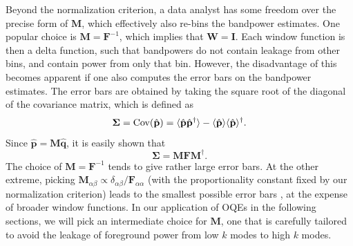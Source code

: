 \documentclass[twocolumn,numberedappendix]{emulateapj} \shorttitle{PSA64}
\newcommand{\phat}{\hat{\mathbf{p}}}
\newcommand{\qhat}{\hat{\mathbf{q}}}
\begin{document}
%
Beyond the normalization criterion, a data analyst has some freedom over the
precise form of $\mathbf{M}$, which effectively also re-bins the bandpower estimates. One 
popular choice is $\mathbf{M} = \mathbf{F}^{-1}$, which implies that $\mathbf{W} = \mathbf{I}$. Each
window function is then a delta function, such that bandpowers do not
contain leakage from other bins, and contain power from only that bin. However, the disadvantage
of this becomes apparent if one also computes the error bars on the bandpower estimates.
The error bars are obtained by taking the square root of the diagonal of the covariance matrix, which is defined as
\begin{equation}\label{eqn:err_cov}
    \boldsymbol \Sigma = \text{Cov}(\hat{\mathbf{p}}) = \expval{\hat{\mathbf{p}}\hat{\mathbf{p}}^{\dagger}} -
             \expval{\hat{\mathbf{p}}}\expval{\hat{\mathbf{p}}}^{\dagger}.
\end{equation}
Since $\phat = \mathbf{M}\qhat$, it is easily shown that 
\begin{equation}
\label{eq:MFM}
  \boldsymbol  \Sigma = \mathbf{M}\mathbf{F}\mathbf{M}^{\dagger}.
\end{equation}
The choice of $\mathbf{M} = \mathbf{F}^{-1}$ tends to give rather large error bars.
At the other extreme, picking $\mathbf{M}_{\alpha \beta} \propto \delta_{\alpha \beta} / \mathbf{F}_{\alpha \alpha}$ (with the proportionality constant fixed by our normalization criterion) 
leads to the smallest possible error bars \citep{tegmark1997}, at the expense of broader
window functions. In our application of OQEs in the following sections, we will pick an intermediate
choice for $\mathbf{M}$, one that is carefully tailored to avoid the leakage of foreground power
from low $k$ modes to high $k$ modes.
\end{document}
